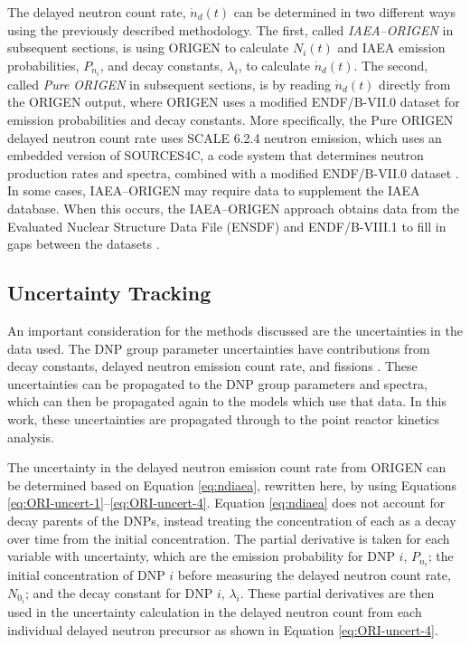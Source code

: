 \documentclass{style/nseJournal}
\begin{document}
The delayed neutron count rate, $\dot{n}_d(t)$ can be determined in two different ways using the previously described methodology.
The first, called \textit{IAEA--ORIGEN} in subsequent sections, is using ORIGEN to calculate $N_i(t)$ and IAEA emission probabilities, $P_{n_i}$, and decay constants, $\lambda_i$, to calculate $\dot{n}_d(t)$.
The second, called \textit{Pure ORIGEN} in subsequent sections, is by reading $\dot{n}_d(t)$ directly from the ORIGEN output, where ORIGEN uses a modified ENDF/B-VII.0 dataset for emission probabilities and decay constants.
More specifically, the Pure ORIGEN delayed neutron count rate uses SCALE 6.2.4 neutron emission, which uses an embedded version of SOURCES4C, a code system that determines neutron production rates and spectra, combined with a modified ENDF/B-VII.0 dataset \cite{wilson2005sources}.
In some cases, IAEA--ORIGEN may require data to supplement the IAEA database.
When this occurs, the IAEA--ORIGEN approach obtains data from the Evaluated Nuclear Structure Data File (ENSDF) and ENDF/B-VIII.1 to fill in gaps between the datasets \cite{tuli2001evaluated, BROWN20181}.


\subsection{Uncertainty Tracking}
\label{sec:uncertainties}
An important consideration for the methods discussed are the uncertainties in the data used.
The DNP group parameter uncertainties have contributions from decay constants, delayed neutron emission count rate, and fissions \cite{radaideh2019new}.
These uncertainties can be propagated to the DNP group parameters and spectra, which can then be propagated again to the models which use that data.
In this work, these uncertainties are propagated through to the point reactor kinetics analysis.

The uncertainty in the delayed neutron emission count rate from ORIGEN can be determined based on Equation \eqref{eq:ndiaea}, rewritten here, by using Equations \eqref{eq:ORI-uncert-1}--\eqref{eq:ORI-uncert-4}.
Equation \eqref{eq:ndiaea} does not account for decay parents of the DNPs, instead treating the concentration of each as a decay over time from the initial concentration.
The partial derivative is taken for each variable with uncertainty, which are the emission probability for DNP $i$, $P_{n_i}$; the initial concentration of DNP $i$ before measuring the delayed neutron count rate, $N_{0_i}$; and the decay constant for DNP $i$, $\lambda_i$. 
These partial derivatives are then used in the uncertainty calculation in the delayed neutron count from each individual delayed neutron precursor as shown in Equation \eqref{eq:ORI-uncert-4}.
\end{document}
